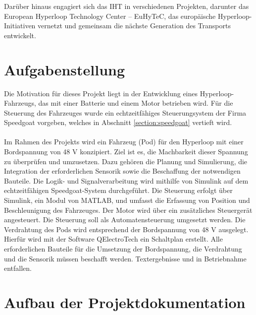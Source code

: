 Darüber hinaus engagiert sich das IHT in verschiedenen Projekten, darunter das \frqq European Hyperloop Technology Center – EuHyTeC\flqq, das europäische Hyperloop-Initiativen vernetzt und gemeinsam die nächste Generation des Transports entwickelt.
\newpage



\section{Aufgabenstellung}
\label{section:Aufgabenstellung}



Die Motivation für dieses Projekt liegt in der Entwicklung eines Hyperloop-Fahrzeugs, das mit einer Batterie und einem Motor betrieben wird. Für die Steuerung des Fahrzeuges wurde ein echtzeitfähiges Steuerungsystem der Firma Speedgoat vorgeben, welches in Abschnitt \ref{section:speedgoat} vertieft wird.\\ \ \\

Im Rahmen des Projekts wird ein Fahrzeug (Pod) für den Hyperloop mit einer Bordspannung von 48 V konzipiert. Ziel ist es, die Machbarkeit dieser Spannung zu überprüfen und umzusetzen. Dazu gehören die Planung und Simulierung, die Integration der erforderlichen Sensorik sowie die Beschaffung der notwendigen Bauteile. Die Logik- und Signalverarbeitung wird mithilfe von Simulink auf dem echtzeitfähigen Speedgoat-System durchgeführt.
Die Steuerung erfolgt über Simulink, ein Modul von MATLAB, und umfasst die Erfassung von Position und Beschleunigung des Fahrzeuges. Der Motor wird über ein zusätzliches Steuergerät angesteuert. Die Steuerung soll als Automatensteuerung umgesetzt werden.
Die Verdrahtung des Pods wird entsprechend der Bordspannung von 48 V ausgelegt. Hierfür wird mit der Software QElectroTech ein Schaltplan erstellt.
Alle erforderlichen Bauteile für die Umsetzung der Bordspannung, die Verdrahtung und die Sensorik müssen beschafft werden.
Textergebnisse und in Betriebnahme entfallen.


\section{Aufbau der Projektdokumentation}
\label{section:Aufbau}
